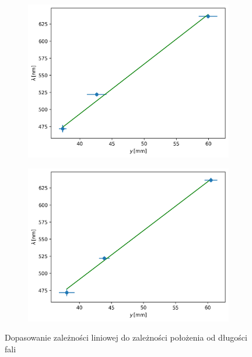 \documentclass[12pt]{article}
\begin{document}
\begin{figure}[H]
	\centering
	\begin{subfigure}{0.45\textwidth}
		\centering
		\includegraphics[width=\linewidth]{line_fit_wavelength_0}
		\label{fig:line_fit_wavelength_1}
	\end{subfigure}
	\hfill
	\begin{subfigure}{0.45\textwidth}
		\centering
		\includegraphics[width=\linewidth]{line_fit_wavelength_1}
		\label{fig:line_fit_wavelength_2}
	\end{subfigure}
	\caption{Dopasowanie zależności liniowej do zależności położenia od długości fali}
	\label{fig:line_fit_wavelength}
\end{figure}
\end{document}
